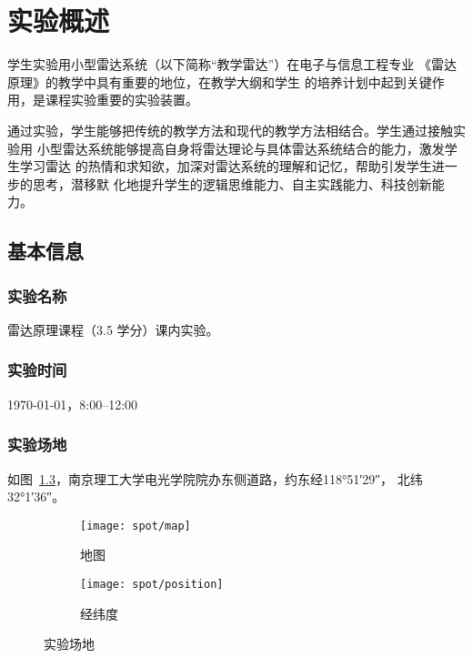 \documentclass[../main]{subfiles}
\begin{document}
\chapter{实验概述}%
\label{cha:introduction}

学生实验用小型雷达系统（以下简称“教学雷达”）在电子与信息工程专业
《雷达原理》\cite{丁鹭飞2009雷达原理}的教学中具有重要的地位，在教学大纲和学生
的培养计划中起到关键作用，是课程实验重要的实验装置。

通过实验，学生能够把传统的教学方法和现代的教学方法相结合。学生通过接触实验用
小型雷达系统能够提高自身将雷达理论与具体雷达系统结合的能力，激发学生学习雷达
的热情和求知欲，加深对雷达系统的理解和记忆，帮助引发学生进一步的思考，潜移默
化地提升学生的逻辑思维能力、自主实践能力、科技创新能力。

\section{基本信息}%
\label{sec:information}

\subsection{实验名称}%
\label{sub:name}

雷达原理课程（3.5 学分）课内实验。

\subsection{实验时间}%
\label{sub:time}

\today，8:00--12:00

\subsection{实验场地}%
\label{sub:spot}

如图~\ref{fig:spot}，南京理工大学电光学院院办东侧道路，约东经\ang{118;51;29}，
北纬\ang{32;1;36}。

\begin{figure}[htbp]
  \centering
  \begin{subfigure}[htbp]{0.45\linewidth}
    \centering
    \texttt{[image: spot/map]}
    \caption{地图}%
    \label{fig:spot/map}
  \end{subfigure}
  \quad
  \begin{subfigure}[htbp]{0.45\linewidth}
    \centering
    \texttt{[image: spot/position]}
    \caption{经纬度}%
    \label{fig:spot/position}
  \end{subfigure}
  \caption{实验场地}%
  \label{fig:spot}
\end{figure}
\end{document}
